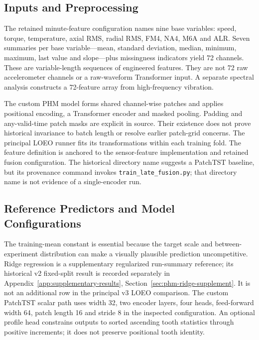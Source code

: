 \subsection{Inputs and Preprocessing}
The retained minute-feature configuration names nine base variables: speed, torque,
temperature, axial RMS, radial RMS, FM4, NA4, M6A and ALR. Seven summaries per base
variable---mean, standard deviation, median, minimum, maximum, last value and
slope---plus missingness indicators yield 72 channels. These are variable-length
sequences of engineered features. They are not 72 raw accelerometer channels or a
raw-waveform Transformer input. A separate spectral analysis constructs a 72-feature
array from high-frequency vibration.

The custom PHM model forms shared channel-wise patches and applies positional encoding,
a Transformer encoder and masked pooling. Padding and any-valid-time patch masks are
explicit in source. Their existence does not prove historical invariance to batch length
or resolve earlier patch-grid concerns. The principal LOEO runner fits its transformations within each training fold.
The feature definition is anchored to the sensor-feature implementation and retained
fusion configuration. The historical directory name suggests a PatchTST baseline, but its
provenance command invokes \texttt{train\_late\_fusion.py}; that directory name is not
evidence of a single-encoder run.
{}
{}

\subsection{Reference Predictors and Model Configurations}
The training-mean constant is essential because the target scale and between-experiment
distribution can make a visually plausible prediction uncompetitive. Ridge regression is a supplementary regularized run-summary reference; its historical
v2 fixed-split result is recorded separately in Appendix~\ref{app:supplementary-results}, Section~\ref{sec:phm-ridge-supplement}.
It is not an additional row in the principal v3 LOEO comparison. The custom PatchTST scalar path uses width 32,
two encoder layers, four heads, feed-forward width 64, patch length 16 and stride 8 in
the inspected configuration. An optional profile head constrains outputs to sorted
ascending tooth statistics through positive increments; it does not preserve positional
tooth identity.

